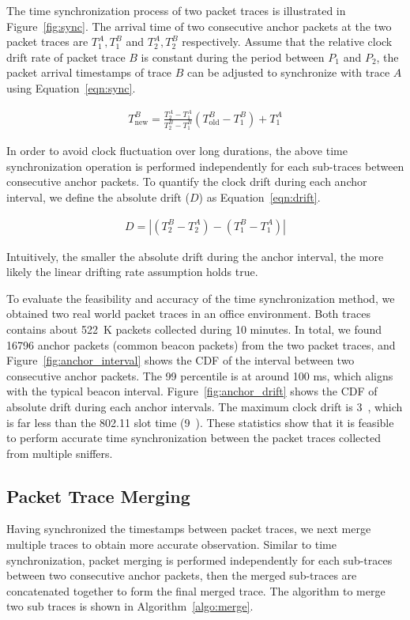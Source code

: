 The time synchronization process of two packet traces is illustrated in
Figure~\ref{fig:sync}. The arrival time of two consecutive anchor packets at the
two packet traces are $T^A_1, T^B_1$ and $T^A_2, T^B_2$ respectively. Assume
that the relative clock drift rate of packet trace $B$ is constant during the
period between $P_1$ and $P_2$, the packet arrival timestamps of trace $B$ can
be adjusted to synchronize with trace $A$ using Equation~\ref{eqn:sync}.

\begin{align}
  T^B_{\text{new}} = \frac{T^A_2-T^A_1}{T^B_2-T^B_1}(T^B_{\text{old}}-T^B_1)+T^A_1
  \label{eqn:sync}
\end{align}

In order to avoid clock fluctuation over long durations, the above time
synchronization operation is performed independently for each sub-traces between
consecutive anchor packets. To quantify the clock drift during each anchor
interval, we define the absolute drift ($D$) as Equation~\ref{eqn:drift}.

\begin{align}
  D = |(T^B_2 - T^A_2) - (T^B_1-T^A_1)|
  \label{eqn:drift}
\end{align}

Intuitively, the smaller the absolute drift during the anchor interval, the more
likely the linear drifting rate assumption holds true.

To evaluate the feasibility and accuracy of the time synchronization method,
we obtained two real world packet traces in an office environment. Both traces
contains about 522~K packets collected during 10 minutes. In total, we found
\num{16796} anchor packets (common beacon packets) from the two packet traces, and
Figure~\ref{fig:anchor_interval} shows the CDF of the interval between two
consecutive anchor packets. The 99 percentile is at around 100 ms, which
aligns with the typical beacon interval. Figure~\ref{fig:anchor_drift}
shows the CDF of absolute drift during each anchor intervals. The maximum clock
drift is 3~\us{}, which is far less than the 802.11 slot time (9~\us{}). These
statistics show that it is feasible to perform accurate time synchronization
between the packet traces collected from multiple sniffers.

\subsection{Packet Trace Merging}

Having synchronized the timestamps between packet traces, we next merge multiple
traces to obtain more accurate observation. Similar to time synchronization,
packet merging is performed independently for each sub-traces between two
consecutive anchor packets, then the merged sub-traces are concatenated together
to form the final merged trace. The algorithm to merge two sub traces is shown
in Algorithm~\ref{algo:merge}.

